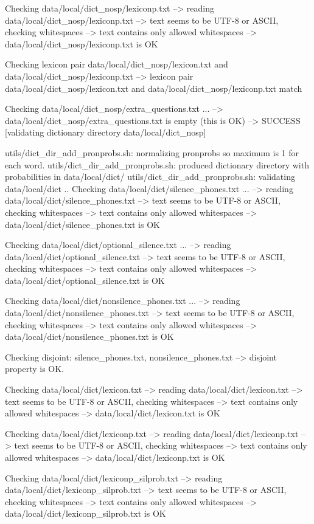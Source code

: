 Checking data/local/dict_nosp/lexiconp.txt
--> reading data/local/dict_nosp/lexiconp.txt
--> text seems to be UTF-8 or ASCII, checking whitespaces
--> text contains only allowed whitespaces
--> data/local/dict_nosp/lexiconp.txt is OK

Checking lexicon pair data/local/dict_nosp/lexicon.txt and data/local/dict_nosp/lexiconp.txt
--> lexicon pair data/local/dict_nosp/lexicon.txt and data/local/dict_nosp/lexiconp.txt match

Checking data/local/dict_nosp/extra_questions.txt ...
--> data/local/dict_nosp/extra_questions.txt is empty (this is OK)
--> SUCCESS [validating dictionary directory data/local/dict_nosp]

utils/dict_dir_add_pronprobs.sh: normalizing pronprobs so maximum is 1 for each word.
utils/dict_dir_add_pronprobs.sh: produced dictionary directory with probabilities in data/local/dict/
utils/dict_dir_add_pronprobs.sh: validating data/local/dict ..
Checking data/local/dict/silence_phones.txt ...
--> reading data/local/dict/silence_phones.txt
--> text seems to be UTF-8 or ASCII, checking whitespaces
--> text contains only allowed whitespaces
--> data/local/dict/silence_phones.txt is OK

Checking data/local/dict/optional_silence.txt ...
--> reading data/local/dict/optional_silence.txt
--> text seems to be UTF-8 or ASCII, checking whitespaces
--> text contains only allowed whitespaces
--> data/local/dict/optional_silence.txt is OK

Checking data/local/dict/nonsilence_phones.txt ...
--> reading data/local/dict/nonsilence_phones.txt
--> text seems to be UTF-8 or ASCII, checking whitespaces
--> text contains only allowed whitespaces
--> data/local/dict/nonsilence_phones.txt is OK

Checking disjoint: silence_phones.txt, nonsilence_phones.txt
--> disjoint property is OK.

Checking data/local/dict/lexicon.txt
--> reading data/local/dict/lexicon.txt
--> text seems to be UTF-8 or ASCII, checking whitespaces
--> text contains only allowed whitespaces
--> data/local/dict/lexicon.txt is OK

Checking data/local/dict/lexiconp.txt
--> reading data/local/dict/lexiconp.txt
--> text seems to be UTF-8 or ASCII, checking whitespaces
--> text contains only allowed whitespaces
--> data/local/dict/lexiconp.txt is OK

Checking data/local/dict/lexiconp_silprob.txt
--> reading data/local/dict/lexiconp_silprob.txt
--> text seems to be UTF-8 or ASCII, checking whitespaces
--> text contains only allowed whitespaces
--> data/local/dict/lexiconp_silprob.txt is OK

